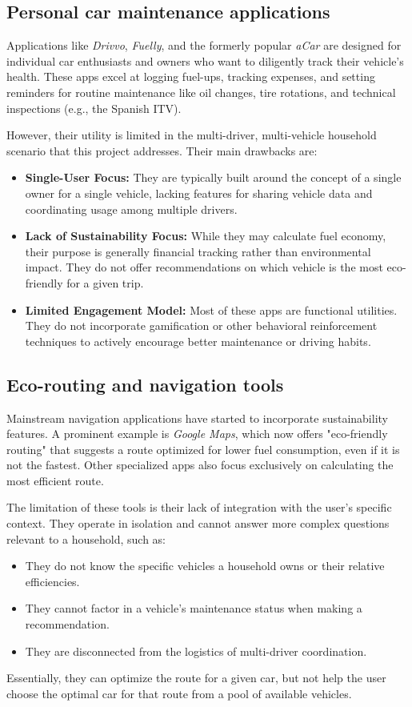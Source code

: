 \subsection{Personal car maintenance applications}
Applications like \textit{Drivvo}, \textit{Fuelly}, and the formerly popular \textit{aCar} are designed for individual car enthusiasts and owners who want to diligently track their vehicle's health. These apps excel at logging fuel-ups, tracking expenses, and setting reminders for routine maintenance like oil changes, tire rotations, and technical inspections (e.g., the Spanish ITV).

\textgap

However, their utility is limited in the multi-driver, multi-vehicle household scenario that this project addresses. Their main drawbacks are:
\begin{itemize}
    \item \textbf{Single-User Focus:} They are typically built around the concept of a single owner for a single vehicle, lacking features for sharing vehicle data and coordinating usage among multiple drivers.
    \item \textbf{Lack of Sustainability Focus:} While they may calculate fuel economy, their purpose is generally financial tracking rather than environmental impact. They do not offer recommendations on which vehicle is the most eco-friendly for a given trip.
    \item \textbf{Limited Engagement Model:} Most of these apps are functional utilities. They do not incorporate gamification or other behavioral reinforcement techniques to actively encourage better maintenance or driving habits.
\end{itemize}

\subsection{Eco-routing and navigation tools}
Mainstream navigation applications have started to incorporate sustainability features. A prominent example is \textit{Google Maps}, which now offers "eco-friendly routing" that suggests a route optimized for lower fuel consumption, even if it is not the fastest. Other specialized apps also focus exclusively on calculating the most efficient route.

\textgap

The limitation of these tools is their lack of integration with the user's specific context. They operate in isolation and cannot answer more complex questions relevant to a household, such as:
\begin{itemize}
    \item They do not know the specific vehicles a household owns or their relative efficiencies.
    \item They cannot factor in a vehicle's maintenance status when making a recommendation.
    \item They are disconnected from the logistics of multi-driver coordination.
\end{itemize}
Essentially, they can optimize the route for a given car, but not help the user choose the optimal car for that route from a pool of available vehicles.

